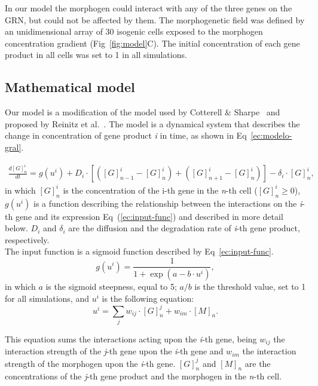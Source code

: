 \documentclass[10pt,letterpaper]{article}
\begin{document}
In our model the morphogen could interact with any of the three genes on the
GRN, but could not be affected by them. The morphogenetic field was defined by
an unidimensional array of 30 isogenic cells exposed to the morphogen
concentration gradient (Fig~\ref{fig:model}C). The initial concentration of
each gene product in all cells was set to 1 in all simulations.\\

\subsection*{Mathematical model}

Our model is a modification of the model used by Cotterell \& Sharpe~\cite{Cotterell2010}
and proposed by Reinitz et al.~\cite{Reinitz1995}. The
model is a dynamical system that describes the change in concentration of gene
product \emph{i} in time, as shown in Eq~\ref{ec:modelo-gral}.

 \begin{eqnarray}
  \frac{d[G]^i_n}{dt}
  = g(u^i) + D_i \cdot [ ([G]^i_{n-1}-[G]^i_n) +([G]^i_{n+1}-[G]^i_n)]-\delta_i
  \cdot [ G ]^i_n ,
  \label{ec:modelo-gral}
 \end{eqnarray}
\noindent
in which $[G]^{i}_{n}$ is the concentration of the i-th gene in the \emph{n}-th
cell ($[G]^{i}_{n} ≥ 0$), $g(u^i)$ is a function describing the relationship
between the interactions on the \emph{i}-th gene and its expression
Eq~(\ref{ec:input-func}) and described in more detail below. $D_i$ and
$\delta_i$ are the diffusion and the degradation rate of \emph{i}-th gene
product, respectively.\\

The input function is a sigmoid function described by Eq~\ref{ec:input-func}.
\begin{equation}
 g(u^i) = \frac{1}{1 + \exp(a - b \cdot u^i)},
 \label{ec:input-func}
\end{equation}
\noindent
in which $a$ is the sigmoid steepness, equal to 5; $a/b$ is the threshold value,
set to 1 for all simulations, and $u^i$ is the following equation:
\begin{equation}
 u^i = \sum_j w_{ij} \cdot [G]^j_n + w_{im} \cdot [M]_n.
 \label{ec:mat-sum}
\end{equation}

This equation sums the interactions acting upon the \emph{i}-th gene, being
$w_{ij}$ the interaction strength of the \emph{j}-th gene upon the \emph{i}-th
gene and $w_{im}$ the interaction strength of the morphogen upon the \emph{i}-th
gene. $[G]^j_n$ and $[M]_n$ are the concentrations of the \emph{j}-th gene
product and the morphogen in the \emph{n}-th cell.
\end{document}
